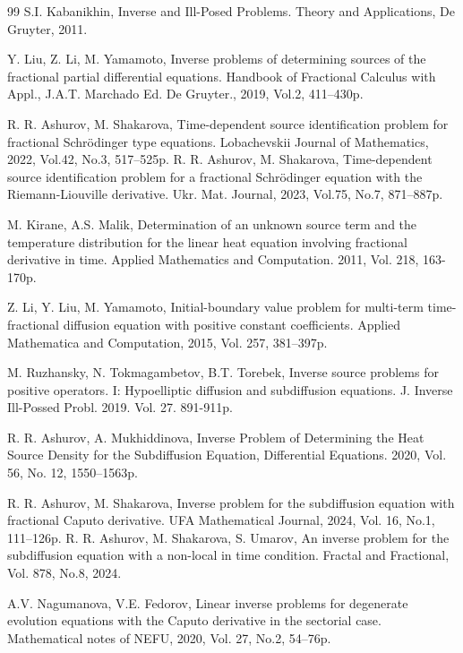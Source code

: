 \documentclass[12pt]{amsart}
\theoremstyle{definition}
\numberwithin{equation}{section}
\begin{document}
\begin{thebibliography}{99}
 S.I. Kabanikhin, Inverse and Ill-Posed Problems. Theory and Applications, De Gruyter, 2011.

 Y. Liu, Z. Li,  M. Yamamoto,  Inverse problems of determining sources of the fractional partial differential equations. Handbook of
Fractional Calculus with Appl., J.A.T. Marchado Ed. De Gruyter.,  2019, Vol.2, 411–430p.


 R. R. Ashurov, M. Shakarova, Time-dependent source identification problem for fractional Schrödinger type equations. Lobachevskii Journal
of Mathematics, 2022, Vol.42, No.3, 517–525p.
 R. R. Ashurov, M. Shakarova, Time-dependent source identification problem for a fractional Schrödinger equation with the Riemann-Liouville derivative. Ukr. Mat. Journal, 2023, Vol.75, No.7, 871–887p.


 M. Kirane, A.S. Malik, Determination of an unknown
source term and the temperature distribution for the linear heat
equation involving fractional derivative in time.  Applied
Mathematics and Computation. 2011, Vol. 218, 163-170p.

 Z. Li,  Y. Liu,  M. Yamamoto, Initial-boundary value problem for multi-term time-fractional diffusion equation with positive constant
coefficients. Applied Mathematica and Computation, 2015, Vol. 257, 381–397p.

  M. Ruzhansky, N. Tokmagambetov, B.T. Torebek, Inverse source problems
for positive operators. I: Hypoelliptic diffusion and subdiffusion
equations.  J. Inverse Ill-Possed Probl. 2019. Vol. 27.
891-911p.

 R. R. Ashurov,  A. Mukhiddinova, Inverse Problem of Determining the Heat Source Density for the Subdiffusion Equation, Differential
Equations. 2020, Vol. 56, No. 12, 1550–1563p.

R. R. Ashurov, M. Shakarova, Inverse problem for the subdiffusion equation with fractional Caputo derivative. UFA Mathematical Journal, 2024,
Vol. 16, No.1, 111–126p. 
 R. R. Ashurov,  M. Shakarova,  S. Umarov, An inverse problem for the subdiffusion equation with a non-local in time condition. Fractal and
Fractional, Vol. 878, No.8, 2024.


 A.V. Nagumanova, V.E. Fedorov, Linear inverse problems for degenerate evolution equations with the Caputo derivative in
the sectorial case. Mathematical notes of NEFU, 2020, Vol. 27, No.2, 54–76p.


\end{thebibliography}
\end{document}

